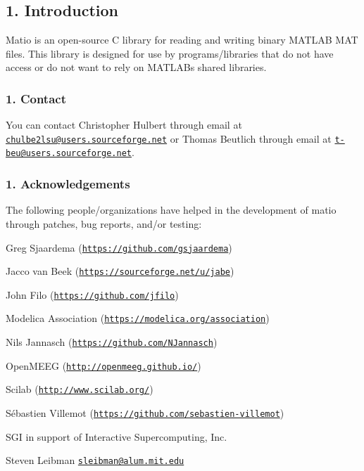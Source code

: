 \subsection*{1. Introduction}

Matio is an open-\/source C library for reading and writing binary M\+A\+T\+L\+AB M\+AT files. This library is designed for use by programs/libraries that do not have access or do not want to rely on M\+A\+T\+L\+AB\textquotesingle{}s shared libraries.

\subsubsection*{1. Contact}

You can contact Christopher Hulbert through email at \href{mailto:chulbe2lsu@users.sourceforge.net}{\tt chulbe2lsu@users.\+sourceforge.\+net} or Thomas Beutlich through email at \href{mailto:t-beu@users.sourceforge.net}{\tt t-\/beu@users.\+sourceforge.\+net}.

\subsubsection*{1. Acknowledgements}

The following people/organizations have helped in the development of matio through patches, bug reports, and/or testing\+:


\begin{DoxyItemize}
\item Greg Sjaardema (\href{https://github.com/gsjaardema}{\tt https\+://github.\+com/gsjaardema})
\item Jacco van Beek (\href{https://sourceforge.net/u/jabe}{\tt https\+://sourceforge.\+net/u/jabe})
\item John Filo (\href{https://github.com/jfilo}{\tt https\+://github.\+com/jfilo})
\item Modelica Association (\href{https://modelica.org/association}{\tt https\+://modelica.\+org/association})
\item Nils Jannasch (\href{https://github.com/NJannasch}{\tt https\+://github.\+com/\+N\+Jannasch})
\item Open\+M\+E\+EG (\href{http://openmeeg.github.io/}{\tt http\+://openmeeg.\+github.\+io/})
\item Scilab (\href{http://www.scilab.org/}{\tt http\+://www.\+scilab.\+org/})
\item Sébastien Villemot (\href{https://github.com/sebastien-villemot}{\tt https\+://github.\+com/sebastien-\/villemot})
\item S\+GI in support of Interactive Supercomputing, Inc.
\item Steven Leibman \href{mailto:sleibman@alum.mit.edu}{\tt sleibman@alum.\+mit.\+edu}
\end{DoxyItemize}

